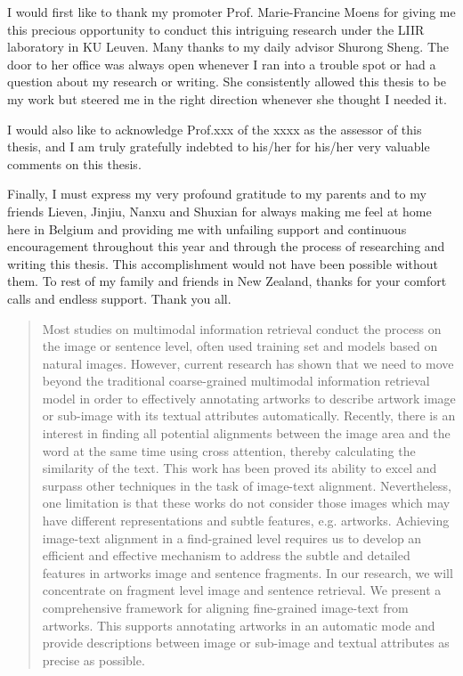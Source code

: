 \documentclass[master=mai,masteroption=bda]{kulemt}
\begin{document}
\begin{preface}
I would first like to thank my promoter Prof. Marie-Francine Moens for giving me this precious opportunity to conduct this intriguing research under the LIIR laboratory in KU Leuven. Many thanks to my daily advisor Shurong Sheng. The door to her office was always open whenever I ran into a trouble spot or had a question about my research or writing. She consistently allowed this thesis to be my work but steered me in the right direction whenever she thought I needed it.

I would also like to acknowledge Prof.xxx of the xxxx as the assessor of this thesis, and I am truly gratefully indebted to his/her for his/her very valuable comments on this thesis.

Finally, I must express my very profound gratitude to my parents and to my friends Lieven, Jinjiu, Nanxu and Shuxian for always making me feel at home here in Belgium and providing me with unfailing support and continuous encouragement throughout this year and through the process of researching and writing this thesis. This accomplishment would not have been possible without them. To rest of my family and friends in New Zealand, thanks for your comfort calls and endless support. Thank you all.

\end{preface}

\tableofcontents*

\begin{abstract}
Most studies on multimodal information retrieval conduct the process on the image or sentence level, often used training set and models based on natural images. However, current research has shown that we need to move beyond the traditional coarse-grained multimodal information retrieval model in order to effectively annotating artworks to describe artwork image or sub-image with its textual attributes automatically. Recently, there is an interest in finding all potential alignments between the image area and the word at the same time using cross attention, thereby calculating the similarity of the text. This work has been proved its ability to excel and surpass other techniques in the task of image-text alignment. Nevertheless, one limitation is that these works do not consider those images which may have different representations and subtle features, e.g. artworks. Achieving image-text alignment in a find-grained level requires us to develop an efficient and effective mechanism to address the subtle and detailed features in artworks image and sentence fragments. In our research, we will concentrate on fragment level image and sentence retrieval. We present a comprehensive framework for aligning fine-grained image-text from artworks. This supports annotating artworks in an automatic mode and provide descriptions between image or sub-image and textual attributes as precise as possible.

\end{abstract}
\end{document}
